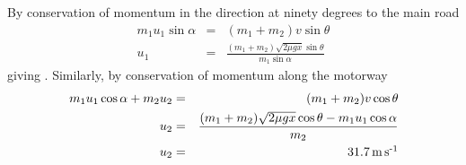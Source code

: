 \begin{problem}
{By conservation of momentum in the direction at ninety degrees to the main road 
\begin{eqnarray}
 m_1 u_1  \sin \alpha &=& (m_1+m_2)v  \sin \theta  \\
 u_1 &=&  \frac{(m_1+m_2) \sqrt{2\mu gx}\sin \theta}{m_1 \sin \alpha}\end{eqnarray}
giving .
Similarly, by conservation of momentum along the motorway 
\begin{eqnarray} 
m_1 u_1 \cos \alpha + m_ 2 u_2 &=& (m_1+m_2) v \cos \theta \\
u_2 &=&   \frac{(m_1+m_2)\sqrt{2\mu gx}\cos \theta - m_1 u_1  \cos \alpha}{m_2} \\
u_2 &=&  \mbox{{${31.7}$}{$\text{\,m\,s$^\text{-1}$}$}}
\end{eqnarray} 
}
\end{problem}
%


